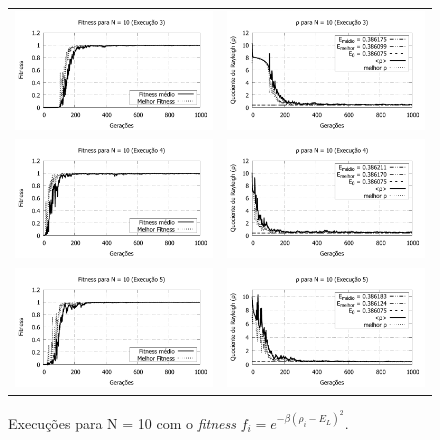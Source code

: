 \begin{figure}[p]
\begin{tabular}{@{}cc@{}}
		\includegraphics[width=.40\textwidth]{figs/resultados/fitnessEL/N-10_E-3_fitness-extendido.pdf} &
    \includegraphics[width=.40\textwidth]{figs/resultados/fitnessEL/N-10_E-3_rho_extendido.pdf}   \\
		\includegraphics[width=.40\textwidth]{figs/resultados/fitnessEL/N-10_E-4_fitness-extendido.pdf} &
    \includegraphics[width=.40\textwidth]{figs/resultados/fitnessEL/N-10_E-4_rho_extendido.pdf} \\
		\includegraphics[width=.40\textwidth]{figs/resultados/fitnessEL/N-10_E-5_fitness-extendido.pdf} &
    \includegraphics[width=.40\textwidth]{figs/resultados/fitnessEL/N-10_E-5_rho_extendido.pdf}
  \end{tabular}
  \caption{Execuções para N = 10 com o \textit{fitness} $f_i = e^{-\beta(\rho_i - E_L)^2}$.}
	\label{fig:execucoes_N10_EL}
	\end{figure}
		

